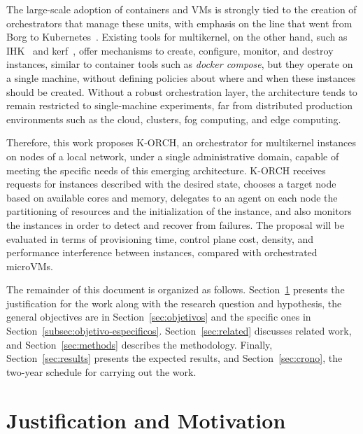 \documentclass[12pt]{article}
\begin{document}
The large-scale adoption of containers and VMs is strongly tied to the creation of orchestrators that manage these
units, with emphasis on the line that went from Borg to
Kubernetes~\cite{burns2016borg}.
Existing tools for multikernel, on the other hand, such as IHK~\cite{shimosawa2014ihk} and kerf~\cite{multikernel2025kerf},
offer mechanisms to create, configure, monitor, and destroy instances, similar to container tools such as \textit{docker compose},
but they operate on a single machine, without defining policies about where and when these instances should be created.
Without a robust orchestration layer, the architecture tends to remain restricted to single-machine experiments, far from
distributed production environments such as the cloud, clusters, fog computing, and edge computing.

Therefore, this work proposes K-ORCH, an orchestrator for multikernel instances on nodes of a local network,
under a single administrative domain, capable of meeting the specific needs of this emerging architecture.
K-ORCH receives requests for
instances described with the desired state, chooses a target node based on available cores and memory, delegates to
an agent on each node the partitioning of resources and the initialization of the instance,
and also monitors the instances in order to detect and recover from failures.
The proposal will be evaluated in terms of
provisioning time, control plane cost, density, and performance interference between instances,
compared with orchestrated microVMs.

The remainder of this document is organized as follows.
Section~\ref{sec:just} presents the justification for the work along with the research question and hypothesis, the general
objectives are in Section~\ref{sec:objetivos} and the specific ones in Section~\ref{subsec:objetivo-especificos}.
Section~\ref{sec:related} discusses related work, and Section~\ref{sec:methods} describes the methodology.
Finally, Section~\ref{sec:results} presents the expected results, and Section~\ref{sec:crono}, the two-year
schedule for carrying out the work.

\section{Justification and Motivation} \label{sec:just}
\end{document}

